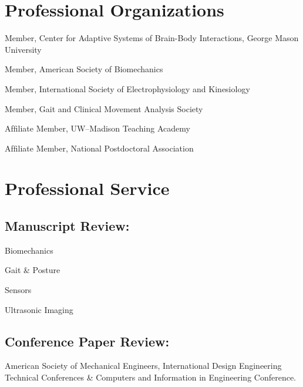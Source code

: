 \documentclass[letterpaper, 10pt]{article}
\begin{document}
\section{Professional Organizations}

\begin{compacthang}
     \item Member, Center for Adaptive Systems of Brain-Body Interactions, George Mason University
     \item Member, American Society of Biomechanics
     \item Member, International Society of Electrophysiology and Kinesiology
     \item Member, Gait and Clinical Movement Analysis Society
     \item Afﬁliate Member, UW--Madison Teaching Academy 
     \item Afﬁliate Member, National Postdoctoral Association
\end{compacthang}

\section{Professional Service}

\subsection{Manuscript Review:}
\setlength{\hangingleftmargin}{2.5em}
\setlength{\hangingindent}{2em}
\begin{compacthang}
    \item Biomechanics
    \item Gait \& Posture
    \item Sensors
    \item Ultrasonic Imaging
\end{compacthang}

\subsection{Conference Paper Review:}
\begin{compacthang}
    \item American Society of Mechanical Engineers, International Design Engineering Technical Conferences \& Computers and Information in Engineering Conference.
\end{compacthang}
\end{document}
